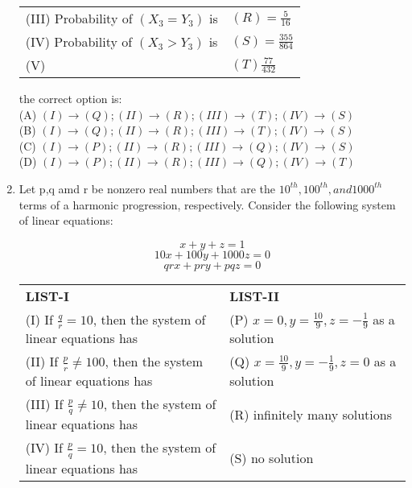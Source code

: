 \documentclass{article}
\begin{document}
\begin{enumerate}
\begin{center}
\begin{tabular}{l l}
	(III) Probability of \( (X_3 = Y_3 )\) is & \((R) = \frac{5}{16} \)\\                                                             \medskip
	(IV) Probability of \( (X_3 > Y_3) \) is & \( (S) = \frac{355}{864} \)\\                                                             \medskip
	(V) & $(T)\frac{77}{432}$\\
	\end{tabular}
\end{center}
 the correct option is:\\
(A) $(I)\to(Q);(II)\to(R);(III)\to(T);(IV)\to(S)$\\   (B) $(I)\to(Q);(II)\to(R);(III)\to(T);(IV)\to(S)$\\   (C) $(I)\to(P);(II)\to(R);(III)\to(Q);(IV)\to(S)$\\   (D) $(I)\to(P);(II)\to(R);(III)\to(Q);(IV)\to(T)$\\

	\item Let p,q amd r  be nonzero real numbers that are the $10^{th}, 100^{th}, and 1000^{th}$ terms of a harmonic progression, respectively. Consider the following system of linear equations:

\[x + y + z = 1\]
\[10x + 100y + 1000z = 0\]
\[qr x + pr y + pq z = 0\]

\begin{center}                                                \begin{tabular}{l l}                                               \textbf{LIST-I} & \textbf{LIST-II} \\
	(I) If \( \frac{q}{r} = 10 \), then the system of linear equations has & (P) \( x = 0,  y = \frac{10}{9}, z = -\frac{1}{9} \) as a solution  \\

	(II) If \( \frac{p}{r} \neq 100 \), then the system of linear equations has & (Q) \( x = \frac{10}{9},  y = -\frac{1}{9},  z = 0 \) as a solution \\

	(III) If \( \frac{p}{q} \neq 10 \), then the system of linear equations has & (R) infinitely many solutions \\                              
	(IV) If \( \frac{p}{q} = 10 \), then the system of linear equations has & (S) no solution \\
	\end{tabular}                                          \end{center}


\end{enumerate}
\end{document}
